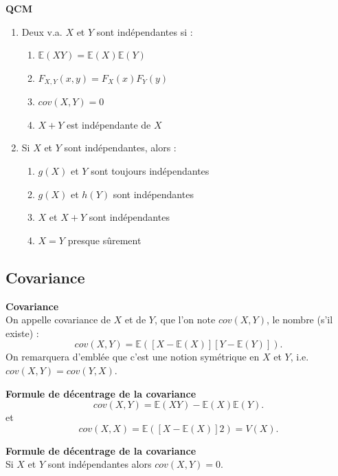 \documentclass[../PolyS4.tex]{subfiles}
\begin{document}
\textbf{QCM}

\begin{enumerate}
\item Deux v.a. $X$ et $Y$ sont indépendantes si :
\begin{enumerate}
\item $\mathbb E(XY)=\mathbb E(X)\mathbb E(Y)$
\item $F_{X,Y}(x,y)=F_X(x)F_Y(y)$
\item $cov(X,Y)=0$
\item $X+Y$ est indépendante de $X$
\end{enumerate}

\item Si $X$ et $Y$ sont indépendantes, alors :
\begin{enumerate}
\item $g(X)$ et $Y$ sont toujours indépendantes
\item $g(X)$ et $h(Y)$ sont indépendantes
\item $X$ et $X+Y$ sont indépendantes
\item $X=Y$ presque sûrement
\end{enumerate}
\end{enumerate}


\subsection{Covariance}

\begin{Def} {\textbf{Covariance}}\\ 
On appelle covariance de $X$ et de $Y$, que l'on note $cov(X, Y )$, le nombre (s'il existe) :
$$cov(X, Y ) = \mathbb E([X - \mathbb E(X)][Y - \mathbb E(Y )]).$$
On remarquera d'emblée que c'est une notion symétrique en $X$ et $Y$, i.e.
$cov(X, Y ) = cov(Y,X)$.
\end{Def}

\begin{Prop}{\textbf{Formule de décentrage de la covariance}}\\ 

$$cov(X, Y ) = \mathbb E(XY ) - \mathbb E(X) \mathbb E(Y ).$$
et
$$cov(X,X) = \mathbb E([X-\mathbb E(X)]2) = V (X).$$
\end{Prop}

\begin{Prop}{\textbf{Formule de décentrage de la covariance}}\\ 
Si $X$ et $Y$ sont indépendantes alors $cov(X, Y ) = 0$.
\end{Prop}
\end{document}
